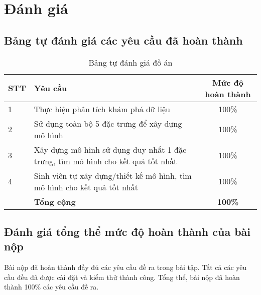 \section{Đánh giá}
\subsection{Bảng tự đánh giá các yêu cầu đã hoàn thành}

\begin{center}
  \begin{table}[H]
    \centering
    \caption{Bảng tự đánh giá đồ án}
    \renewcommand{\arraystretch}{1.4}
    \begin{tabular}{|l|p{}|c|}
      \hline
      \textbf{STT} & \textbf{Yêu cầu}                                                                & \textbf{Mức độ hoàn thành} \\ \hline
      1            & Thực hiện phân tích khám phá dữ liệu                                            & 100\%                      \\ \hline
      2            & Sử dụng toàn bộ 5 đặc trưng để xây dựng mô hình                                 & 100\%                      \\ \hline
      3            & Xây dựng mô hình sử dụng duy nhất 1 đặc trưng, tìm mô hình cho kết quả tốt nhất & 100\%                      \\ \hline

      4            & Sinh viên tự xây dựng/thiết kế mô hình, tìm mô hình cho kết quả tốt nhất        & 100\%                      \\ \hline
                   & \textbf{Tổng cộng}                                                              & \textbf{100\%}             \\ \hline
    \end{tabular}
    \label{tab:mytable}
  \end{table}
\end{center}

\subsection{Đánh giá tổng thể mức độ hoàn thành của bài nộp}

Bài nộp đã hoàn thành đầy đủ các yêu cầu đề ra trong bài tập. Tất cả các yêu cầu đều đã được cài đặt và kiểm thử thành công. Tổng thể, bài nộp đã hoàn thành 100\% các yêu cầu đề ra.
